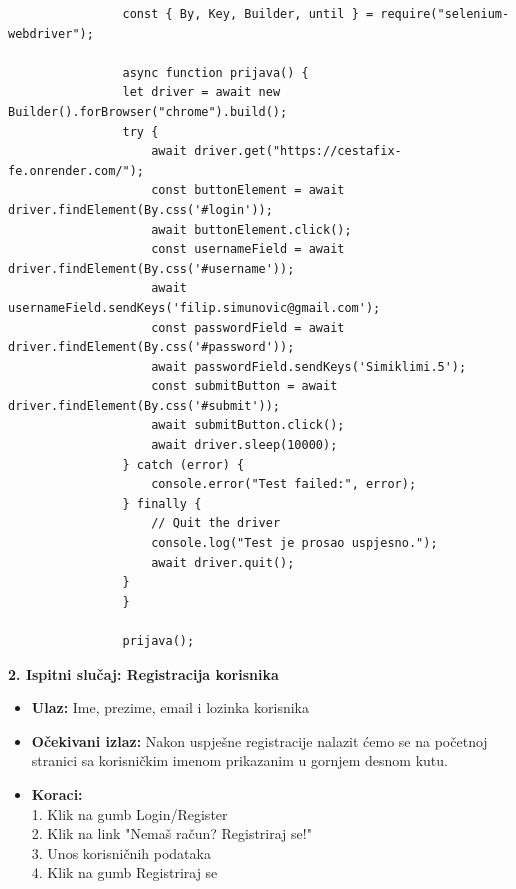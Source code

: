			\begin{verbatim}
				const { By, Key, Builder, until } = require("selenium-webdriver");

				async function prijava() {
				let driver = await new Builder().forBrowser("chrome").build();
				try {
					await driver.get("https://cestafix-fe.onrender.com/");
					const buttonElement = await driver.findElement(By.css('#login'));
					await buttonElement.click();
					const usernameField = await driver.findElement(By.css('#username'));
					await usernameField.sendKeys('filip.simunovic@gmail.com');
					const passwordField = await driver.findElement(By.css('#password'));
					await passwordField.sendKeys('Simiklimi.5');
					const submitButton = await driver.findElement(By.css('#submit'));
					await submitButton.click();
					await driver.sleep(10000);
				} catch (error) {
					console.error("Test failed:", error);
				} finally {
					// Quit the driver
					console.log("Test je prosao uspjesno.");
					await driver.quit();
				}
				}

				prijava();
			\end{verbatim}

			\textbf{2. Ispitni slučaj: Registracija korisnika}
			 \begin{itemize}
				\item \textbf{Ulaz:} Ime, prezime, email i lozinka korisnika
				\item \textbf{Očekivani izlaz:} Nakon uspješne registracije nalazit ćemo se na početnoj stranici sa korisničkim imenom prikazanim u gornjem desnom kutu.
				\item \textbf{Koraci:} 
				\\ 1. Klik na gumb Login/Register
				\\ 2. Klik na link "Nemaš račun? Registriraj se!"
				\\ 3. Unos korisničnih podataka
				\\ 4. Klik na gumb Registriraj se
			\end{itemize}

